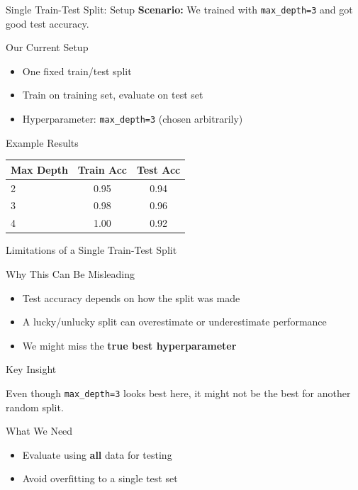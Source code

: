 \documentclass{beamer}
\begin{document}
\begin{frame}{Single Train-Test Split: Setup}
\textbf{Scenario:}  
We trained with \texttt{max\_depth=3} and got good test accuracy.

\pause
\begin{block}{Our Current Setup}
\begin{itemize}
    \item One fixed train/test split
    \item Train on training set, evaluate on test set
    \item Hyperparameter: \texttt{max\_depth=3} (chosen arbitrarily)
\end{itemize}
\end{block}

\pause
\begin{block}{Example Results}
\small
\begin{tabular}{lcc}
\toprule
Max Depth & Train Acc & Test Acc \\
\midrule
2 & 0.95 & 0.94 \\
3 & 0.98 & 0.96 \\
4 & 1.00 & 0.92 \\
\bottomrule
\end{tabular}
\end{block}
\end{frame}

\begin{frame}{Limitations of a Single Train-Test Split}
\begin{block}{Why This Can Be Misleading}
		\scriptsize

\begin{itemize}
    \item Test accuracy depends on how the split was made
    \item A lucky/unlucky split can overestimate or underestimate performance
    \item We might miss the \textbf{true best hyperparameter}
\end{itemize}
\end{block}

\pause
\begin{alertblock}{Key Insight}
		\scriptsize

Even though \texttt{max\_depth=3} looks best here,  
it might not be the best for another random split.
\end{alertblock}

\pause
\begin{block}{What We Need}
	\scriptsize
\begin{itemize}
    \item Evaluate using \textbf{all} data for testing
    \item Avoid overfitting to a single test set
\end{itemize}
\end{block}

\end{frame}
\end{document}
